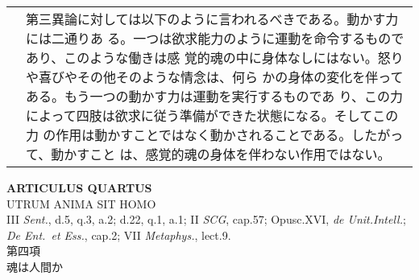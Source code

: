 \documentclass[paper=a4paper,fontsize=10pt,jafontsize=9pt,titlepage]{jlreq}
\begin{document}
\begin{longtable}{p{21em}p{21em}}
&

第三異論に対しては以下のように言われるべきである。動かす力には二通りあ
る。一つは欲求能力のように運動を命令するものであり、このような働きは感
覚的魂の中に身体なしにはない。怒りや喜びやその他そのような情念は、何ら
かの身体の変化を伴ってある。もう一つの動かす力は運動を実行するものであ
り、この力によって四肢は欲求に従う準備ができた状態になる。そしてこの力
の作用は動かすことではなく動かされることである。したがって、動かすこと
は、感覚的魂の身体を伴わない作用ではない。


\end{longtable}
\newpage


\begin{center}
{\Large {\bfseries ARTICULUS QUARTUS}}\\
{\large UTRUM ANIMA SIT HOMO}\\
{\footnotesize III {\itshape Sent.}, d.5, q.3, a.2; d.22, q.1, a.1; II
 {\itshape SCG}, cap.57; Opusc.XVI, {\itshape de Unit.Intell.};
 {\itshape De Ent.~et Ess.}, cap.2; VII {\itshape Metaphys.}, lect.9.}\\
{\Large 第四項\\魂は人間か}
\end{center}
\end{document}

